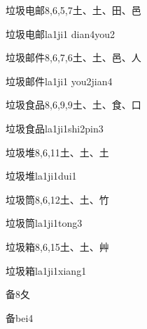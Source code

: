 \begin{Entry}{垃圾电邮}{8,6,5,7}{⼟、⼟、⽥、⾢}
  \begin{Phonetics}{垃圾电邮}{la1ji1 dian4you2}
  \end{Phonetics}
\end{Entry}

\begin{Entry}{垃圾邮件}{8,6,7,6}{⼟、⼟、⾢、⼈}
  \begin{Phonetics}{垃圾邮件}{la1ji1 you2jian4}
  \end{Phonetics}
\end{Entry}

\begin{Entry}{垃圾食品}{8,6,9,9}{⼟、⼟、⾷、⼝}
  \begin{Phonetics}{垃圾食品}{la1ji1shi2pin3}
  \end{Phonetics}
\end{Entry}

\begin{Entry}{垃圾堆}{8,6,11}{⼟、⼟、⼟}
  \begin{Phonetics}{垃圾堆}{la1ji1dui1}
  \end{Phonetics}
\end{Entry}

\begin{Entry}{垃圾筒}{8,6,12}{⼟、⼟、⽵}
  \begin{Phonetics}{垃圾筒}{la1ji1tong3}
  \end{Phonetics}
\end{Entry}

\begin{Entry}{垃圾箱}{8,6,15}{⼟、⼟、⾋}
  \begin{Phonetics}{垃圾箱}{la1ji1xiang1}
  \end{Phonetics}
\end{Entry}

\begin{Entry}{备}{8}{⼡}
  \begin{Phonetics}{备}{bei4}
  \end{Phonetics}
\end{Entry}

